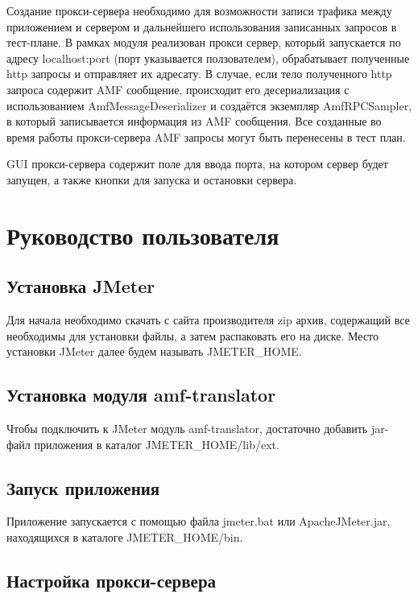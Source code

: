 Создание прокси-сервера необходимо для возможности записи трафика между приложением и сервером и дальнейшего использования 
записанных запросов в тест-плане. В рамках модуля реализован прокси сервер, который запускается по адресу 
localhost:port (порт указывается ползователем), обрабатывает полученные http запросы и отправляет их адресату. 
В случае, если тело полученного http запроса содержит AMF сообщение, происходит его десериализация с использованием 
AmfMessageDeserializer и создаётся экземпляр 
AmfRPCSampler, в который записывается информация из AMF сообщения. Все созданные во время работы прокси-сервера AMF запросы 
могут быть перенесены в тест план.

GUI прокси-сервера содержит поле для ввода порта, на котором сервер будет запущен, а также кнопки для запуска и остановки 
сервера.

\section{Руководство пользователя}

\subsection{Установка JMeter}

Для начала необходимо скачать с сайта производителя zip архив, содержащий все необходимы для установки файлы,
а затем распаковать его на диске. Место установки JMeter далее будем называть JMETER\_HOME.

\subsection{Установка модуля amf-translator}

Чтобы подключить к JMeter модуль amf-translator, достаточно добавить jar-файл приложения в каталог JMETER\_HOME/lib/ext.

\subsection{Запуск приложения}

Приложение запускается с помощью файла jmeter.bat или ApacheJMeter.jar, находящихся в каталоге JMETER\_HOME/bin.

\subsection{Настройка прокси-сервера}

